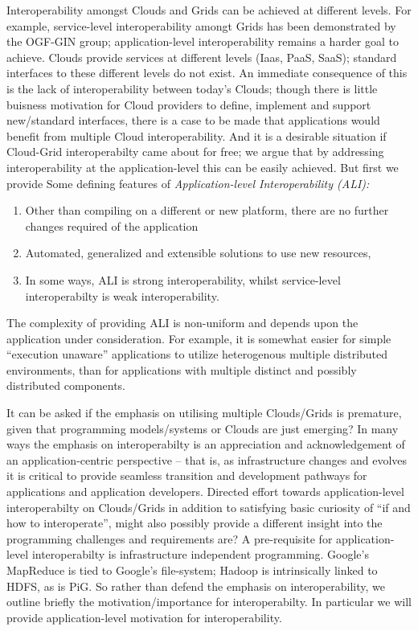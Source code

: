 \documentclass[conference,final]{IEEEtran}
\begin{document}
Interoperability amongst Clouds and Grids can be achieved at different
levels. For example, service-level interoperability amongt Grids has
been demonstrated by the OGF-GIN group; application-level
interoperability remains a harder goal to achieve.  Clouds provide
services at different levels (Iaas, PaaS, SaaS); standard interfaces
to these different levels do not exist. An immediate consequence of
this is the lack of interoperability between today's Clouds; though
there is little buisness motivation for Cloud providers to define,
implement and support new/standard interfaces, there is a case to be
made that applications would benefit from multiple Cloud
interoperability.  And it is a desirable situation if Cloud-Grid
interoperabilty came about for free; we argue that by addressing
interoperability at the application-level this can be easily achieved.
But first we provide Some defining features of {\it Application-level
  Interoperability (ALI):}
\begin{enumerate}
\item Other than compiling on a different or new platform, there are no
  further changes required of the application
\item Automated, generalized and extensible solutions to use new resources,
\item In some ways, ALI is strong interoperability, whilst
  service-level interoperabilty is weak interoperability.
\end{enumerate}

The complexity of providing ALI is non-uniform and depends upon the
application under consideration. For example, it is somewhat easier
for simple ``execution unaware'' applications to utilize heterogenous
multiple distributed environments, than for applications with multiple
distinct and possibly distributed components.

It can be asked if the emphasis on utilising multiple Clouds/Grids is
premature, given that programming models/systems or Clouds are just
emerging? In many ways the emphasis on interoperabilty is an
appreciation and acknowledgement of an application-centric perspective
-- that is, as infrastructure changes and evolves it is critical to
provide seamless transition and development pathways for applications
and application developers. Directed effort towards application-level
interoperabilty on Clouds/Grids in addition to satisfying basic
curiosity of ``if and how to interoperate'', might also possibly
provide a different insight into the programming challenges and
requirements are?  A pre-requisite for application-level
interoperabilty is infrastructure independent programming. Google's
MapReduce is tied to Google's file-system; Hadoop is intrinsically
linked to HDFS, as is PiG.  So rather than defend the emphasis on
interoperability, we outline briefly the motivation/importance for
interoperabilty. In particular we will provide application-level
motivation for interoperability.
\end{document}
